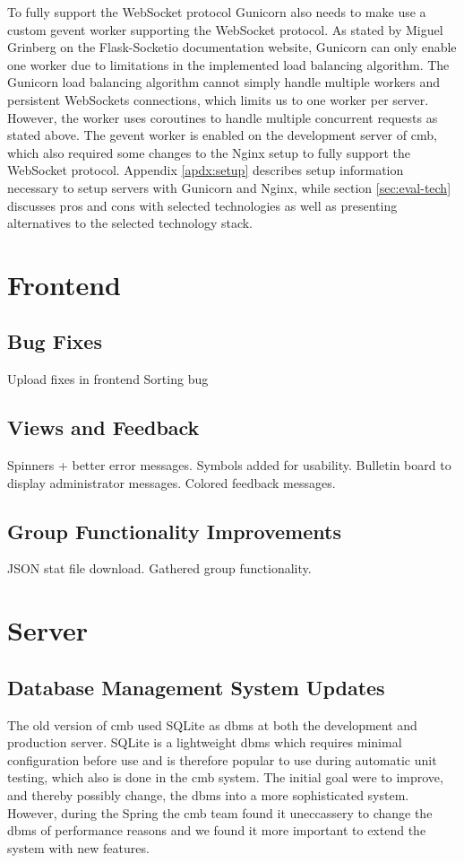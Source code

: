 To fully support the WebSocket protocol Gunicorn also needs to make use a custom gevent worker supporting the WebSocket protocol. As stated by Miguel Grinberg on the Flask-Socketio documentation website, Gunicorn can only enable one worker due to limitations in the implemented load balancing algorithm. The Gunicorn load balancing algorithm cannot simply handle multiple workers and persistent WebSockets connections, which limits us to one worker per server. However, the worker uses coroutines to handle multiple concurrent requests as stated above. The gevent worker is enabled on the development server of \gls{cmb}, which also required some changes to the Nginx setup to fully support the WebSocket protocol. Appendix \ref{apdx:setup} describes setup information necessary to setup servers with Gunicorn and Nginx, while section \ref{sec:eval-tech} discusses pros and cons with selected technologies as well as presenting alternatives to the selected technology stack.

\section{Frontend}
\subsection{Bug Fixes}
Upload fixes in frontend
Sorting bug

\subsection{Views and Feedback}
Spinners + better error messages. Symbols added for usability. Bulletin board to display administrator messages. Colored feedback messages.

\subsection{Group Functionality Improvements}
JSON stat file download. Gathered group functionality.

\section{Server}

\subsection{Database Management System Updates}
The old version of \gls{cmb} used SQLite \cite{SQLITE} as \gls{dbms} at both the development and production server. SQLite is a lightweight \gls{dbms} which requires minimal configuration before use and is therefore popular to use during automatic unit testing, which also is done in the \gls{cmb} system. The initial goal were to improve, and thereby possibly change, the \gls{dbms} into a more sophisticated system. However, during the Spring the \gls{cmb} team found it uneccassery to change the \gls{dbms} of performance reasons and we found it more important to extend the system with new features. \\

